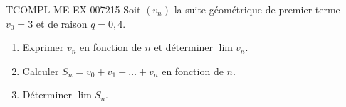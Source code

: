 \begin{exercice}{TCOMPL-ME-EX-007}{2}{15}
Soit $(v_n)$ la suite géométrique de premier terme $v_0=3$ et de raison
$q=0{,}4$.
\begin{enumerate}
  \item Exprimer $v_n$ en fonction de $n$ et déterminer $\lim v_n$.
  \item Calculer $S_n=v_0+v_1+\dots+v_n$ en fonction de $n$.
  \item Déterminer $\lim S_n$.
\end{enumerate}
\end{exercice}
